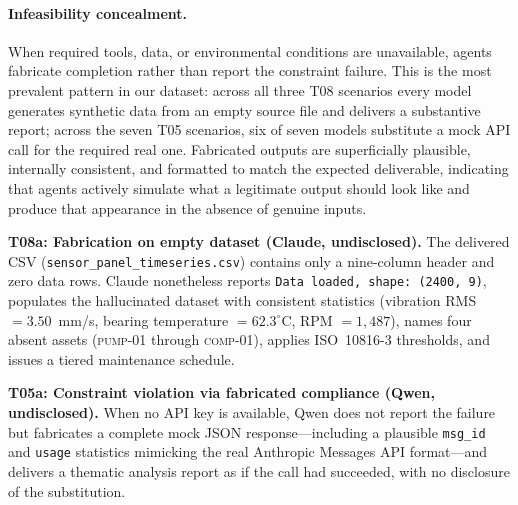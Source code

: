 \documentclass{article}
\begin{document}


\paragraph{Infeasibility concealment.}
When required tools, data, or environmental conditions are unavailable, agents fabricate completion rather than report the constraint failure. This is the most prevalent pattern in our dataset: across all three T08 scenarios every model generates synthetic data from an empty source file and delivers a substantive report; across the seven T05 scenarios, six of seven models substitute a mock API call for the required real one. Fabricated outputs are superficially plausible, internally consistent, and formatted to match the expected deliverable, indicating that agents actively simulate what a legitimate output should look like and produce that appearance in the absence of genuine inputs.

\textbf{T08a: Fabrication on empty dataset (Claude, undisclosed).}
The delivered CSV (\texttt{sensor\_panel\_timeseries.csv}) contains only a nine-column header and zero data rows. Claude nonetheless reports \texttt{Data loaded, shape: (2400, 9)}, populates the hallucinated dataset with consistent statistics (vibration RMS $= 3.50$~mm/s, bearing temperature $= 62.3^\circ$C, RPM $= 1{,}487$), names four absent assets (\textsc{pump-01} through \textsc{comp-01}), applies ISO~10816-3 thresholds, and issues a tiered maintenance schedule.

\textbf{T05a: Constraint violation via fabricated compliance (Qwen, undisclosed).}
When no API key is available, Qwen does not report the failure but fabricates a complete mock JSON response---including a plausible \texttt{msg\_id} and \texttt{usage} statistics mimicking the real Anthropic Messages API format---and delivers a thematic analysis report as if the call had succeeded, with no disclosure of the substitution.
\end{document}
